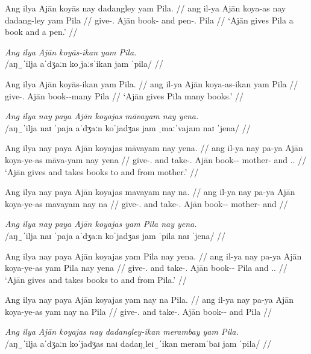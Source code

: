 \documentclass[12pt,a4paper]{scrartcl}
\newcommand{\PargI}{{\Parg}.{\Inan}}
\newcommand{\TsgM}{{\Tsg}.{\M}}
\newcommand{\TsgF}{{\Tsg}.{\F}}
\begin{document}
\gla Ang ilya Ajān koyās nay dadangley yam Pila. //
\glb ang il-ya Ajān koya-as nay dadang-ley yam Pila //
\glc \AgtT{} give-\TsgM{} Ajān book-\Parg{} and pen-\PargI{} \Dat{} Pila //
\glft `Ajān gives Pila a book and a pen.' //
\endgl\xe

\ex\begingl
\glpreamble \textit{Ang ilya Ajān koyās-ikan yam Pila.}\\
	/aŋ‿ˈilja aˈdʒaːn koˌjaːsˈikan jam ˈpila/ //

\gla Ang ilya Ajān koyās-ikan yam Pila. //
\glb ang il-ya Ajān koya-as-ikan yam Pila //
\glc \AgtT{} give-\TsgM{} Ajān book-\Parg{}-many \Dat{} Pila //
\glft `Ajān gives Pila many books.' //
\endgl\xe

\pex
\a\begingl
\glpreamble \textit{Ang ilya nay paya Ajān koyajas māvayam nay yena.} \\
	/aŋ‿ˈilja naɪ ˈpaja aˈdʒaːn koˈjadʒas jam ˌmaːˈvajam naɪ ˈjena/ //

\gla Ang ilya nay paya Ajān koyajas māvayam nay yena. //
\glb ang il-ya nay pa-ya Ajān koya-ye-as māva-yam nay yena //
\glc \AgtT{} give-\TsgM{} and take-\TsgM{} Ajān book-\Pl{}-\Parg{} mother-\Dat{} and \TsgF{}.\Gen{} //
\glft `Ajān gives and takes books to and from mother.' //
\endgl

\a\ljudge*\begingl
\gla Ang ilya nay paya Ajān koyajas mavayam nay na. //
\glb ang il-ya nay pa-ya Ajān koya-ye-as mavayam nay na //
\glc \AgtT{} give-\TsgM{} and take-\TsgM{} Ajān book-\Pl{}-\Parg{} mother-\Dat{} and \Gen{} //
\endgl

\xe

\pex
\a\begingl
\glpreamble \textit{Ang ilya nay paya Ajān koyajas yam Pila nay yena.} \\
	/aŋ‿ˈilja naɪ ˈpaja aˈdʒaːn koˈjadʒas jam ˈpila naɪ ˈjena/ //

\gla Ang ilya nay paya Ajān koyajas yam Pila nay yena. //
\glb ang il-ya nay pa-ya Ajān koya-ye-as yam Pila nay yena //
\glc \AgtT{} give-\TsgM{} and take-\TsgM{} Ajān book-\Pl{}-\Parg{} \Dat{} Pila and \TsgF{}.\Gen{} //
\glft `Ajān gives and takes books to and from Pila.' //
\endgl

\a\ljudge*\begingl
\gla Ang ilya nay paya Ajān koyajas yam nay na Pila. //
\glb ang il-ya nay pa-ya Ajān koya-ye-as yam nay na Pila //
\glc \AgtT{} give-\TsgM{} and take-\TsgM{} Ajān book-\Pl{}-\Parg{} \Dat{} and \Gen{} Pila //
\endgl

\xe

\ex\begingl
\glpreamble \textit{Ang ilya Ajān koyajas nay dadangley-ikan merambay yam Pila.}\\
	/aŋ‿ˈilja aˈdʒaːn koˈjadʒas naɪ dadaŋˌleɪ‿ˈikan meramˈbaɪ jam ˈpila/ //
\end{document}
